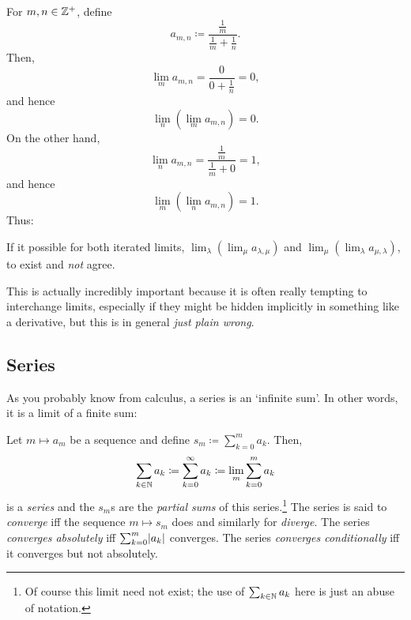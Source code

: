 \begin{exm}
For $m,n\in \mathbb{Z} ^+$, define
\begin{equation}
a_{m,n}\coloneqq \frac{\tfrac{1}{m}}{\tfrac{1}{m}+\tfrac{1}{n}}.
\end{equation}
Then,
\begin{equation}
\lim _ma_{m,n}=\frac{0}{0+\tfrac{1}{n}}=0,
\end{equation}
and hence
\begin{equation}
\lim _n\left( \lim _ma_{m,n}\right) =0.
\end{equation}
On the other hand,
\begin{equation}
\lim _na_{m,n}=\frac{\tfrac{1}{m}}{\tfrac{1}{m}+0}=1,
\end{equation}
and hence
\begin{equation}
\lim _m\left( \lim _na_{m,n}\right) =1.
\end{equation}
Thus:
\begin{textequation}
If it possible for both iterated limits, $\lim _\lambda \left( \lim _\mu a_{\lambda ,\mu}\right)$ and $\lim _\mu \left( \lim _\lambda a_{\mu ,\lambda}\right)$, to exist and \emph{not} agree.
\end{textequation}
\begin{rmk}
This is actually incredibly important because it is often really tempting to interchange limits, especially if they might be hidden implicitly in something like a derivative, but this is in general \emph{just plain wrong}.
\end{rmk}
\end{exm}

\subsection{Series}\label{sbs3.3.5}

As you probably know from calculus, a series is an `infinite sum'.  In other words, it is a limit of a finite sum:
\begin{dfn}[Series]
Let $m\mapsto a_m$ be a sequence and define $s_m\coloneqq \sum _{k=0}^ma_k$.  Then,
\begin{equation}
\sum _{k\in \mathbb{N}}a_k\coloneqq \sum _{k=0}^\infty a_k\coloneqq \lim _m\sum _{k=0}^ma_k
\end{equation}
is a \emph{series} and the $s_m$s are the \emph{partial sums} of this series.\footnote{Of course this limit need not exist; the use of $\sum _{k\in \mathbb{N}}a_k$ here is just an abuse of notation.}  The series is said to \emph{converge} iff the sequence $m\mapsto s_m$ does and similarly for \emph{diverge}.  The series \emph{converges absolutely} iff $\sum _{k=0}^m\lvert a_k\rvert$ converges.  The series \emph{converges conditionally} iff it converges but not absolutely.
\end{dfn}

